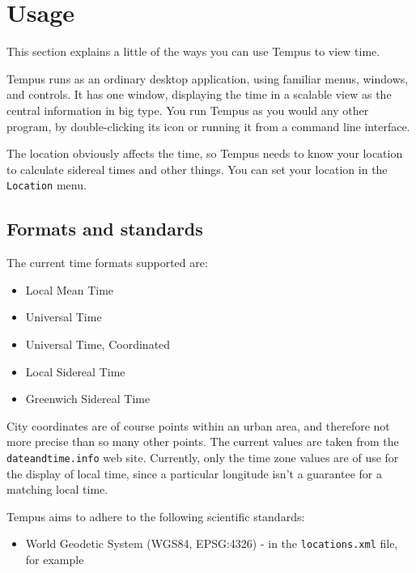 \section{Usage}

This section explains a little of the ways you can use Tempus to view time.

Tempus runs as an ordinary desktop application, using familiar menus, windows, and controls. It has one window, displaying the time in a scalable view as the central information in big type.
You run Tempus as you would any other program, by double-clicking its icon or running it from a command line interface. 

The location obviously affects the time, so Tempus needs to know your location to calculate sidereal times and other things. You can set your location in the \texttt{Location} menu.

\subsection{Formats and standards}

The current time formats supported are:
\begin{itemize}
    \item Local Mean Time
    \item Universal Time
    \item Universal Time, Coordinated
    \item Local Sidereal Time
    \item Greenwich Sidereal Time
\end{itemize}

City coordinates are of course points within an urban area, and therefore not more precise than so many other points. The current values are taken from the \texttt{dateandtime.info} web site. Currently, only the time zone values are of use for the display of local time, since a particular longitude isn't a guarantee for a matching local time.

Tempus aims to adhere to the following scientific standards:

\begin{itemize}
    \item World Geodetic System (WGS84, EPSG:4326) - in the \texttt{locations.xml} file, for example
\end{itemize}

